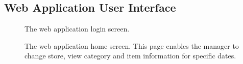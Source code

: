 \documentclass[a4paper,11pt]{report}
\begin{document}
\begin{appendix}
    \chapter{Web Application User Interface}
    \label{appendix:webUI}
    \begin{figure}[H]
        \centering
        \caption{The web application login screen.}
        \label{fig:swaggerList}
    \end{figure}
    \begin{figure}[H]
        \centering
        \caption{The web application home screen. This page enables the manager to change store, view category and item information for specific dates.}
        \label{fig:endpointDocs}
    \end{figure}
    \begin{figure}[H]
        \centering

\end{figure}
\end{appendix}
\end{document}
